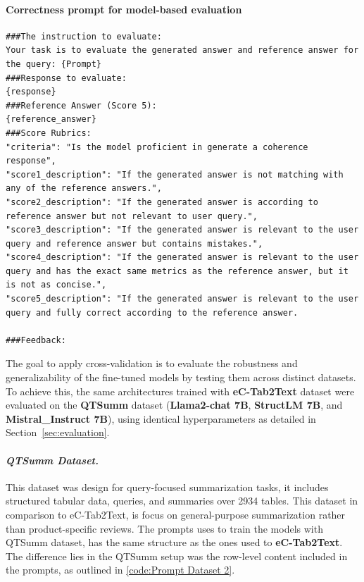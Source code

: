 \paragraph{Correctness prompt for model-based evaluation}

\begin{lstlisting}[style=textstyle, frame = single, caption=Prompt estructured correctness \citep{kim2024prometheus2opensource}, label=code:estructured-correctness]
###The instruction to evaluate:
Your task is to evaluate the generated answer and reference answer for the query: {Prompt}
###Response to evaluate:
{response}
###Reference Answer (Score 5):
{reference_answer}
###Score Rubrics:
"criteria": "Is the model proficient in generate a coherence response",
"score1_description": "If the generated answer is not matching with any of the reference answers.",
"score2_description": "If the generated answer is according to reference answer but not relevant to user query.",
"score3_description": "If the generated answer is relevant to the user query and reference answer but contains mistakes.",
"score4_description": "If the generated answer is relevant to the user query and has the exact same metrics as the reference answer, but it is not as concise.",
"score5_description": "If the generated answer is relevant to the user query and fully correct according to the reference answer.

###Feedback: 
\end{lstlisting}

The goal to apply cross-validation is to evaluate the robustness and generalizability of the fine-tuned models by testing them across distinct datasets. To achieve this, the same architectures trained with \textbf{eC-Tab2Text} dataset were evaluated on the \textbf{QTSumm} dataset \citep{zhao2023qtsummqueryfocusedsummarizationtabular}(\textbf{Llama2-chat 7B}, \textbf{StructLM 7B}, and \textbf{Mistral\_Instruct 7B}), using identical hyperparameters as detailed in Section~\ref{sec:evaluation}.
\paragraph{\textit{QTSumm Dataset.}\label{par:Prompt QTSumm}\citep{zhao2023qtsummqueryfocusedsummarizationtabular}} This dataset was design for query-focused summarization tasks, it includes structured tabular data, queries, and summaries over 2934 tables. This dataset in comparison to eC-Tab2Text, is focus on general-purpose summarization rather than product-specific reviews. The prompts uses to train the models with QTSumm dataset, has the same structure as the ones used to \textbf{eC-Tab2Text}. The difference lies in the QTSumm setup was the row-level content included in the prompts, as outlined in \ref{code:Prompt Dataset 2}.

